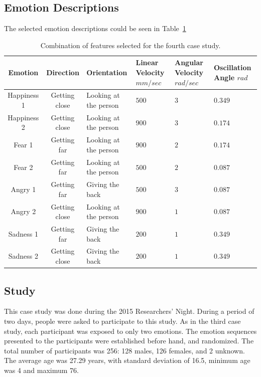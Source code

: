 \subsection{Emotion Descriptions} 

The selected emotion descriptions could be seen in Table~\ref{table:features_2}
\begin{table}[tbh]
\begin{center}
\caption{Combination of features selected for the fourth case study.}
\label{table:features_2}
\small
\begin{tabular}{|c|c|p{2.5 cm}|p{2 cm}|p{2 cm}|p{2.5cm}|}
\hline 
\textbf{Emotion} & \textbf{Direction} & \textbf{Orientation} & \textbf{Linear Velocity} $mm/sec$& \textbf{Angular Velocity} $rad/sec$& \textbf{Oscillation Angle} $rad$\\
\hline
Happiness 1 & Getting close & Looking at the person & $500$  & $3$ & $0.349$ \\
\hline
Happiness 2 & Getting close & Looking at the person & $900$ & $3$ & $0.174$ \\
\hline
Fear 1 & Getting far & Looking at the person & $900$ & $2$ & $0.174$ \\
\hline
Fear 2 & Getting far & Looking at the person & $500$ & $2$ & $0.087$ \\
\hline
Angry 1 & Getting far & Giving the back & $500$ & $3$ & $0.087$ \\
\hline
Angry 2 & Getting close & Looking at the person & $900$ & $1$ & $0.087$ \\
\hline
Sadness 1 & Getting far & Giving the back & $200$ & $1$ & $0.349$ \\
\hline
Sadness 2 & Getting close & Giving the back & $200$ & $1$  & $0.349$ \\
\hline
\end{tabular}
\end{center}
\end{table} 

\subsection{Study}

This case study was done during the 2015 Researchers' Night. During a period of two days, people were asked to participate to this study. As in the third case study, each participant was exposed to only two emotions. The emotion sequences presented to the participants were established before hand, and randomized. The total number of participants was 256: 128 males, 126 females, and 2 unknown. The average age was 27.29 years, with standard deviation of 16.5, minimum age was 4 and maximum 76. 

